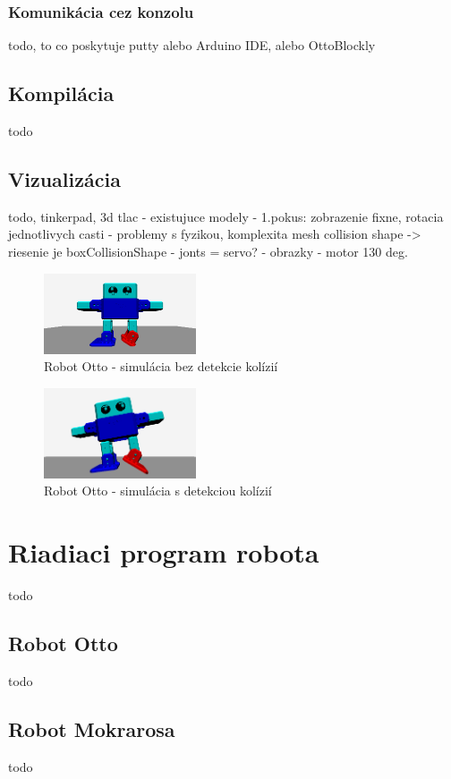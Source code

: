 \subsubsection{Komunikácia cez konzolu}
todo, to co poskytuje putty alebo Arduino IDE, alebo OttoBlockly

\subsection{Kompilácia}
todo

\subsection{Vizualizácia}
todo, tinkerpad, 3d tlac - existujuce modely
- 1.pokus: zobrazenie fixne, rotacia jednotlivych casti
- problemy s fyzikou, komplexita mesh collision shape -> riesenie je boxCollisionShape
- jonts = servo?
- obrazky - motor 130 deg.

\begin{figure}
\centerline{\includegraphics[width=0.4\textwidth]{images/otto-without-collision}}
\caption[Robot Otto - simulácia bez detekcie kolízií]{Robot Otto - simulácia bez detekcie kolízií}
\label{obr:otto-without-collision}
\end{figure}

\begin{figure}
\centerline{\includegraphics[width=0.4\textwidth]{images/otto-with-collision}}
\caption[Robot Otto - simulácia s detekciou kolízií]{Robot Otto - simulácia s detekciou kolízií}
\label{obr:otto-with-collision}
\end{figure}

\section{Riadiaci program robota}
todo

\subsection{Robot Otto}
todo

\subsection{Robot Mokrarosa}
todo
